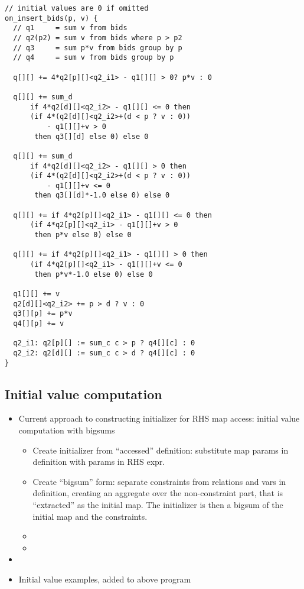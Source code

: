 \begin{verbatim}
// initial values are 0 if omitted
on_insert_bids(p, v) {
  // q1     = sum v from bids
  // q2(p2) = sum v from bids where p > p2
  // q3     = sum p*v from bids group by p
  // q4     = sum v from bids group by p

  q[][] += 4*q2[p][]<q2_i1> - q1[][] > 0? p*v : 0
  
  q[][] += sum_d
      if 4*q2[d][]<q2_i2> - q1[][] <= 0 then
      (if 4*(q2[d][]<q2_i2>+(d < p ? v : 0))
          - q1[][]+v > 0
       then q3[][d] else 0) else 0
  
  q[][] += sum_d
      if 4*q2[d][]<q2_i2> - q1[][] > 0 then
      (if 4*(q2[d][]<q2_i2>+(d < p ? v : 0))
          - q1[][]+v <= 0
       then q3[][d]*-1.0 else 0) else 0
  
  q[][] += if 4*q2[p][]<q2_i1> - q1[][] <= 0 then
      (if 4*q2[p][]<q2_i1> - q1[][]+v > 0
       then p*v else 0) else 0
  
  q[][] += if 4*q2[p][]<q2_i1> - q1[][] > 0 then
      (if 4*q2[p][]<q2_i1> - q1[][]+v <= 0 
       then p*v*-1.0 else 0) else 0

  q1[][] += v
  q2[d][]<q2_i2> += p > d ? v : 0 
  q3[][p] += p*v
  q4[][p] += v
  
  q2_i1: q2[p][] := sum_c c > p ? q4[][c] : 0
  q2_i2: q2[d][] := sum_c c > d ? q4[][c] : 0
}
\end{verbatim}

\subsection{Initial value computation}

\begin{itemize}
  \item Current approach to constructing initializer for RHS map access:
  initial value computation with bigsums
  \begin{itemize}
    \item Create initializer from ``accessed'' definition: substitute map params in
    definition with params in RHS expr. 
    \item Create ``bigsum'' form: separate constraints from relations and vars
    in definition, creating an aggregate over the non-constraint part, that is
    ``extracted'' as the initial map. The initializer is then a bigsum of the
    initial map and the constraints.
    \item {}
    \item {}
  \end{itemize}
  \item {}
  \item Initial value examples, added to above program
\end{itemize}

